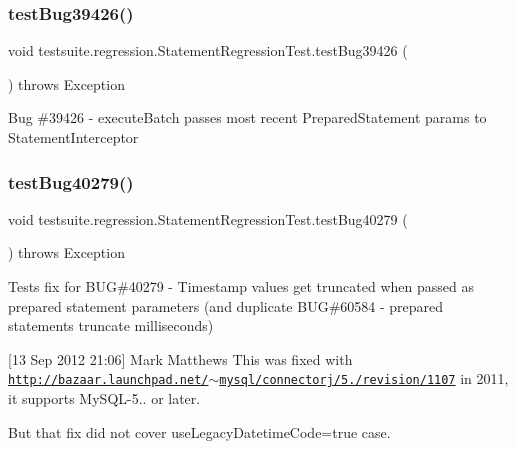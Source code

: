 \subsubsection{\texorpdfstring{test\+Bug39426()}{testBug39426()}}
{\footnotesize\ttfamily void testsuite.\+regression.\+Statement\+Regression\+Test.\+test\+Bug39426 (\begin{DoxyParamCaption}{ }\end{DoxyParamCaption}) throws Exception}

Bug \#39426 -\/ execute\+Batch passes most recent Prepared\+Statement params to Statement\+Interceptor \mbox{\label{classtestsuite_1_1regression_1_1_statement_regression_test_adcee0bfb85026b28841f5a0cd08125a2}} 
\subsubsection{\texorpdfstring{test\+Bug40279()}{testBug40279()}}
{\footnotesize\ttfamily void testsuite.\+regression.\+Statement\+Regression\+Test.\+test\+Bug40279 (\begin{DoxyParamCaption}{ }\end{DoxyParamCaption}) throws Exception}

Tests fix for B\+UG\#40279 -\/ Timestamp values get truncated when passed as prepared statement parameters (and duplicate B\+UG\#60584 -\/ prepared statements truncate milliseconds)

\mbox{[}13 Sep 2012 21\+:06\mbox{]} Mark Matthews This was fixed with \href{http://bazaar.launchpad.net/~mysql/connectorj/5.1/revision/1107}{\tt http\+://bazaar.\+launchpad.\+net/$\sim$mysql/connectorj/5./revision/1107} in 2011, it supports My\+S\+Q\+L-\/5.. or later.

But that fix did not cover use\+Legacy\+Datetime\+Code=true case.


